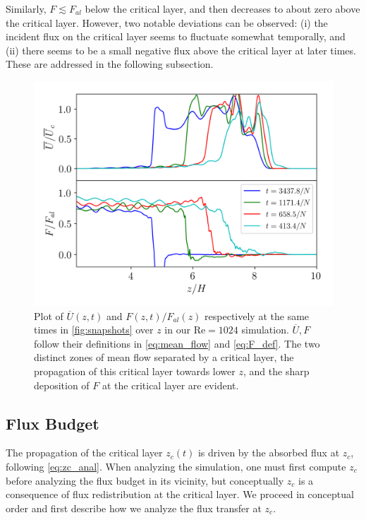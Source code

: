 \documentclass[
        fleqn,
        usenatbib,
        referee,
    ]{mnras}
\begin{document}
Similarly, $F \lesssim F_{al}$ below the critical layer, and then decreases to
about zero above the critical layer. However, two notable deviations can be
observed: (i) the incident flux on the critical layer seems to fluctuate
somewhat temporally, and (ii) there seems to be a small negative flux above the
critical layer at later times. These are addressed in the following subsection.
\begin{figure}
    \centering
    \includegraphics[width=\columnwidth]{plots/nl_fluxes.png}
    \caption{Plot of $\overline{U}(z, t)$ and $F(z, t) / F_{al}(z)$ respectively
    at the same times in \autoref{fig:snapshots} over $z$ in our $\mathrm{Re} =
    1024$ simulation. $\overline{U}, F$ follow their definitions in
    \autoref{eq:mean_flow} and \autoref{eq:F_def}. The two distinct zones of
    mean flow separated by a critical layer, the propagation of this critical
    layer towards lower $z$, and the sharp deposition of $F$ at the critical
    layer are evident.}\label{fig:nl_fluxes}
\end{figure}

\subsection{Flux Budget}\label{ss:flux_budget}

The propagation of the critical layer $z_c(t)$ is driven by the absorbed flux at
$z_c$, following \autoref{eq:zc_anal}. When analyzing the simulation, one must
first compute $z_c$ before analyzing the flux budget in its vicinity, but
conceptually $z_c$ is a consequence of flux redistribution at the critical
layer. We proceed in conceptual order and first describe how we analyze the flux
transfer at $z_c$.
\end{document}
